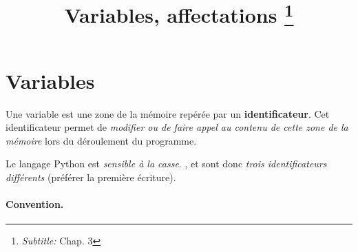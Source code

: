 \documentclass{article}
\newcommand{\tmem}[1]{{\em #1\/}}
\newcommand{\tmstrong}[1]{\textbf{#1}}
\newcommand{\tmsubtitle}[1]{\thanks{\textit{Subtitle:} #1}}
\begin{document}
{\setthispageheader{}}\title{
  Variables, affectations
  \tmsubtitle{Chap. 3}
}

\maketitle

\hrulefill

{\tableofcontents}

\hrulefill

\section{Variables}

\begin{tmornamented}[roundcorner=1.7ex]
  Une variable est une zone de la mémoire repérée par un
  {\tmstrong{identificateur}}. Cet identificateur permet de {\tmem{modifier ou
  de faire appel au contenu de cette zone de la mémoire}} lors du
  déroulement du programme.
\end{tmornamented}

\begin{remark*}
  Le langage Python est {\tmem{sensible à la casse}}.
  {}, {} et {} sont
  donc {\tmem{trois identificateurs différents}} (préférer la première
  écriture).
\end{remark*}

\paragraph{Convention.}
\end{document}
